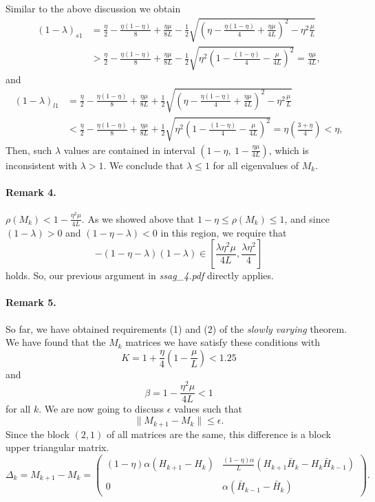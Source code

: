 \documentclass[11pt]{article}
\begin{document}
Similar to the above discussion we obtain 
  \begin{align*}
   (1-\lambda)_{s1} &=\frac{\eta}{2}-\frac{\eta(1-\eta)}{8}+\frac{\eta\mu}{8L} -\frac{1}{2}\sqrt{\left(\eta-\frac{\eta(1-\eta)}{4}+\frac{\eta\mu}{4L}\right)^2-\eta^2\frac{\mu}{L}}\\ 
   &> \frac{\eta}{2}-\frac{\eta(1-\eta)}{8}+\frac{\eta\mu}{8L}-\frac{1}{2}\sqrt{\eta^2\left(1-\frac{(1-\eta)}{4}-\frac{\mu}{4L}\right)^2} = \frac{\eta\mu}{4L},
  \end{align*}
and
  \begin{align*}
   (1-\lambda)_{l1} &=\frac{\eta}{2}-\frac{\eta(1-\eta)}{8}+\frac{\eta\mu}{8L} +\frac{1}{2}\sqrt{\left(\eta-\frac{\eta(1-\eta)}{4}+\frac{\eta\mu}{4L}\right)^2-\eta^2\frac{\mu}{L}}\\ 
   &< \frac{\eta}{2}-\frac{\eta(1-\eta)}{8}+\frac{\eta\mu}{8L}+\frac{1}{2}\sqrt{\eta^2\left(1-\frac{(1-\eta)}{4}-\frac{\mu}{4L}\right)^2} = \eta(\frac{3+\eta}{4})<\eta,
  \end{align*}
Then, such $\lambda$ values are contained in interval $\left(\displaystyle 1-\eta , \ 1-\frac{\eta\mu}{4L}\right)$, which is inconsistent with $\lambda>1$.  We conclude that $\lambda\leq 1$ for all eigenvalues of $M_k$.
 
\bigskip

\paragraph{Remark 4.} $\rho(M_k)< 1-\displaystyle\frac{\eta^2\mu}{4L}$. As we showed above that $1-\eta\leq\rho(M_k)\leq 1$, and since $(1-\lambda)>0$ and $(1-\eta-\lambda)<0$ in this region, we require that 
\[
-(1-\eta-\lambda)(1-\lambda)\in[\frac{\lambda\eta^2\mu}{4L},\frac{\lambda\eta^2}{4}] 
\]
holds.  So, our previous argument in \emph{ssag\_4.pdf} directly applies.


\bigskip

\paragraph{Remark 5.} So far, we have obtained requirements (1) and (2) of the \emph{slowly varying} theorem.  We have found that the $M_k$ matrices we have satisfy these conditions with
\[
 K = 1 + \displaystyle\frac{\eta}{4}\left(1-\frac{\mu}{L}\right)<1.25
\]
and
\[
 \beta = 1-\displaystyle\frac{\eta^2\mu}{4L}<1
\]
for all $k$.  We are now going to discuss $\epsilon$ values such that
\[
 \|M_{k+1}-M_k\| \leq \epsilon.
\]
Since the block $(2,1)$ of all matrices are the same, this difference is a block upper triangular matrix. 
\[
 \Delta_k = M_{k+1}-M_k = \begin{pmatrix} (1-\eta)\alpha(H_{k+1}-H_k) & \displaystyle\frac{(1-\eta)\alpha}{L}(H_{k+1}\bar H_k-H_k\bar H_{k-1})\\  
 \\
                   0  & \alpha(\bar H_{k-1}-\bar H_k) \end{pmatrix}.
\]
\end{document}
